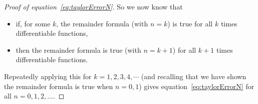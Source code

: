 \begin{proof}[Proof of equation~\eqref{eq:taylorErrorN}]

So we now know that
\begin{itemize}
\item if, for some $k$, the remainder formula (with $n=k$) is true
for all $k$ times differentiable functions,
\item then the remainder formula  is true (with $n=k+1$) for all $k+1$ times
differentiable functions.
\end{itemize}
Repeatedly applying this for $k=1,2,3,4,\cdots$ (and recalling that we have shown the
remainder formula is true when $n=0,1$)  gives  equation~\eqref{eq:taylorErrorN} for all
$n=0,1,2,\dots$.
\end{proof}


\graphicspath{{figures/applications/}}



